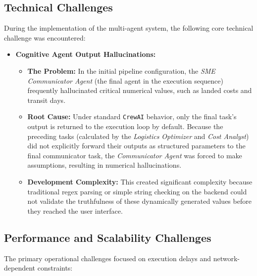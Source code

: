 \subsection[Technical Challenges]{Technical Challenges}
During the implementation of the multi-agent system, the following core technical challenge was encountered:

\begin{itemize}
    \item \textbf{Cognitive Agent Output Hallucinations:}
    \begin{itemize}
        \item \textbf{The Problem:} In the initial pipeline configuration, the \textit{SME Communicator Agent} (the final agent in the execution sequence) frequently hallucinated critical numerical values, such as landed costs and transit days.
        \item \textbf{Root Cause:} Under standard \texttt{CrewAI} behavior, only the final task's output is returned to the execution loop by default. Because the preceding tasks (calculated by the \textit{Logistics Optimizer} and \textit{Cost Analyst}) did not explicitly forward their outputs as structured parameters to the final communicator task, the \textit{Communicator Agent} was forced to make assumptions, resulting in numerical hallucinations.
        \item \textbf{Development Complexity:} This created significant complexity because traditional regex parsing or simple string checking on the backend could not validate the truthfulness of these dynamically generated values before they reached the user interface.
    \end{itemize}
\end{itemize}

\subsection[Performance and Scalability Challenges]{Performance and Scalability Challenges}
The primary operational challenges focused on execution delays and network-dependent constraints:


